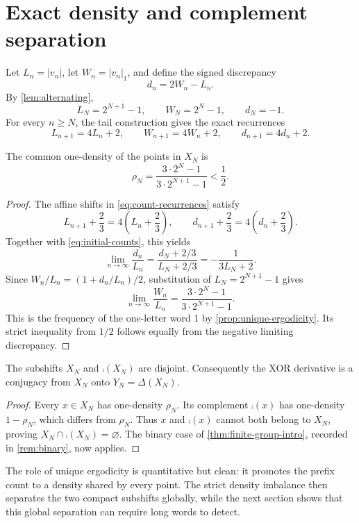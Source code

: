 \section{Exact density and complement separation}

Let $L_n=|v_n|$, let $W_n=|v_n|_1$, and define the signed discrepancy
\[
 d_n=2W_n-L_n.
\]
By \cref{lem:alternating},
\begin{equation}\label{eq:initial-counts}
 L_N=2^{N+1}-1,\qquad W_N=2^N-1,\qquad d_N=-1.
\end{equation}
For every $n\geq N$, the tail construction gives the exact recurrences
\begin{equation}\label{eq:count-recurrences}
 L_{n+1}=4L_n+2,\qquad W_{n+1}=4W_n+2,\qquad d_{n+1}=4d_n+2.
\end{equation}

\begin{proposition}\label{prop:density}
The common one-density of the points in $X_N$ is
\[
 \rho_N=\frac{3\cdot2^N-1}{3\cdot2^{N+1}-1}<\frac12.
\]
\end{proposition}

\begin{proof}
The affine shifts in \eqref{eq:count-recurrences} satisfy
\[
 L_{n+1}+\frac23=4\left(L_n+\frac23\right),
 \qquad
 d_{n+1}+\frac23=4\left(d_n+\frac23\right).
\]
Together with \eqref{eq:initial-counts}, this yields
\[
 \lim_{n\to\infty}\frac{d_n}{L_n}
 =\frac{d_N+2/3}{L_N+2/3}
 =-\frac{1}{3L_N+2}.
\]
Since $W_n/L_n=(1+d_n/L_n)/2$, substitution of
$L_N=2^{N+1}-1$ gives
\[
 \lim_{n\to\infty}\frac{W_n}{L_n}
 =\frac{3\cdot2^N-1}{3\cdot2^{N+1}-1}.
\]
This is the frequency of the one-letter word $1$ by
\cref{prop:unique-ergodicity}.  Its strict inequality from $1/2$ follows
equally from the negative limiting discrepancy.
\end{proof}

\begin{corollary}\label{cor:complement-disjoint}
The subshifts $X_N$ and $\comp(X_N)$ are disjoint.  Consequently the XOR
derivative is a conjugacy from $X_N$ onto $Y_N=\Delta(X_N)$.
\end{corollary}

\begin{proof}
Every $x\in X_N$ has one-density $\rho_N$.  Its complement $\comp(x)$ has
one-density $1-\rho_N$, which differs from $\rho_N$.  Thus $x$ and
$\comp(x)$ cannot both belong to $X_N$, proving
$X_N\cap\comp(X_N)=\varnothing$.  The binary case of
\cref{thm:finite-group-intro}, recorded in \cref{rem:binary}, now applies.
\end{proof}

The role of unique ergodicity is quantitative but clean: it promotes the
prefix count to a density shared by every point.  The strict density imbalance
then separates the two compact subshifts globally, while the next section
shows that this global separation can require long words to detect.
